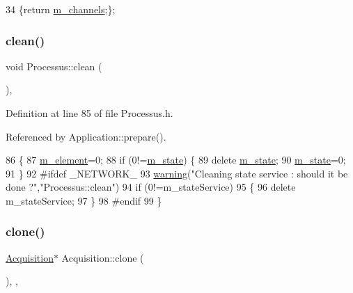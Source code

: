 \begin{DoxyCode}
34 \{\textcolor{keywordflow}{return} \hyperlink{classAcquisition_aedc8b29f322ef00540797fbd0d5112d1}{m\_channels};\};
\end{DoxyCode}
\mbox{\label{classProcessus_aaeb17673b98d2b39f3aa780e335e0968}} 
\subsubsection{\texorpdfstring{clean()}{clean()}}
{\footnotesize\ttfamily void Processus\+::clean (\begin{DoxyParamCaption}{ }\end{DoxyParamCaption})\hspace{0.3cm}{\ttfamily [inline]}, {\ttfamily [inherited]}}



Definition at line 85 of file Processus.\+h.



Referenced by Application\+::prepare().


\begin{DoxyCode}
86   \{
87     \hyperlink{classProcessus_aa9d24d53c3e52f36786cabb5d8e296e7}{m\_element}=0;
88     \textcolor{keywordflow}{if} (0!=\hyperlink{classProcessus_ab3539eee42891ceae0baf4395ae7fb61}{m\_state}) \{
89       \textcolor{keyword}{delete} \hyperlink{classProcessus_ab3539eee42891ceae0baf4395ae7fb61}{m\_state};
90       \hyperlink{classProcessus_ab3539eee42891ceae0baf4395ae7fb61}{m\_state}=0;
91     \}
92 \textcolor{preprocessor}{#ifdef \_NETWORK\_
}
93     \hyperlink{classObject_a65cd4fda577711660821fd2cd5a3b4c9}{warning}(\textcolor{stringliteral}{"Cleaning state service : should it be done ?"},\textcolor{stringliteral}{"Processus::clean"})
94       if (0!=m\_stateService)
95       \{
96         \textcolor{keyword}{delete} m\_stateService;
97       \}
98 \textcolor{preprocessor}{#endif
}
99   \}
\end{DoxyCode}
\mbox{\label{classAcquisition_a4b1b690ef27f20b3e1ad9383f2f57628}} 
\subsubsection{\texorpdfstring{clone()}{clone()}}
{\footnotesize\ttfamily \hyperlink{classAcquisition_1_1Acquisition}{Acquisition}$\ast$ Acquisition\+::clone (\begin{DoxyParamCaption}{ }\end{DoxyParamCaption})\hspace{0.3cm}{\ttfamily [inline]}, {\ttfamily [protected]}, {\ttfamily [virtual]}}

